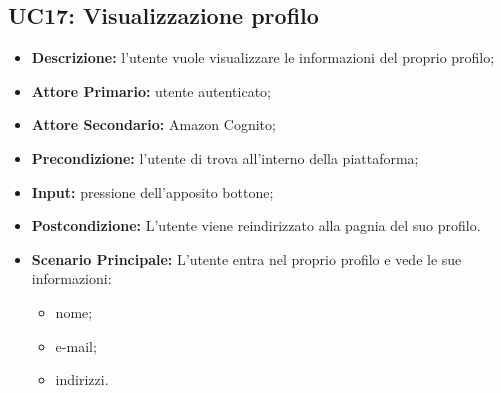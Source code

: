 \subsection{UC17: Visualizzazione profilo}
\label{sec:UC17}
\begin{itemize}
    \item \textbf{Descrizione:} l'utente vuole visualizzare le informazioni del proprio profilo;
    \item \textbf{Attore Primario:} utente autenticato;
    \item \textbf{Attore Secondario:} Amazon Cognito;
    \item \textbf{Precondizione:} l'utente di trova all'interno della piattaforma;
    \item \textbf{Input:} pressione dell'apposito bottone;
    \item \textbf{Postcondizione:} L'utente viene reindirizzato alla pagnia del suo profilo.
    \item \textbf{Scenario Principale:} L'utente entra nel proprio profilo e vede le sue informazioni:
    \begin{itemize}
        \item nome;
        \item e-mail;
        \item indirizzi.
    \end{itemize}
\end{itemize}